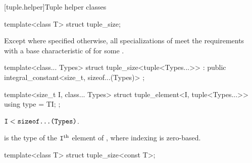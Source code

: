 [tuple.helper]{Tuple helper classes}

%
\begin{itemdecl}
template<class T> struct tuple_size;
\end{itemdecl}

\begin{itemdescr}
\pnum
Except where specified otherwise,
all specializations of  meet the
 requirements with a
base characteristic of 
for some .
\end{itemdescr}

%
\begin{itemdecl}
template<class... Types>
  struct tuple_size<tuple<Types...>> : public integral_constant<size_t, sizeof...(Types)> { };
\end{itemdecl}

%
\begin{itemdecl}
template<size_t I, class... Types>
  struct tuple_element<I, tuple<Types...>> {
    using type = TI;
  };
\end{itemdecl}

\begin{itemdescr}
\pnum
\mandates
$\texttt{\protect I} < \texttt{\protect sizeof...(Types)}$.

\pnum
\ctype
{} is the
type of the $\texttt{\protect I}^\text{th}$ element of ,
where indexing is zero-based.
\end{itemdescr}

%
\begin{itemdecl}
template<class T> struct tuple_size<const T>;
\end{itemdecl}

